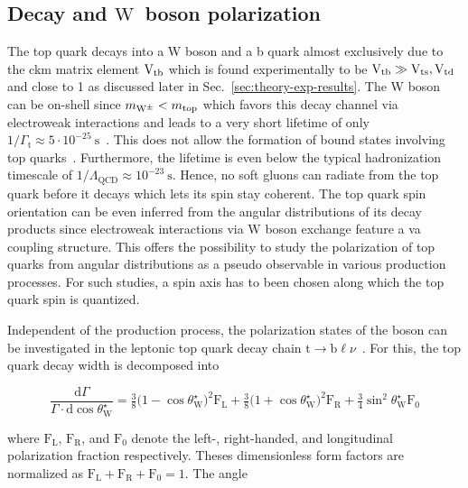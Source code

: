 \subsection{Decay and $\mathrm{W}$~boson polarization}

The top quark decays into a W boson and a b quark almost exclusively due to the \gls{ckm} matrix element ${\mathrm{V}_\mathrm{tb}}$ which is found experimentally to be ${\mathrm{V}_\mathrm{tb}}\gg{\mathrm{V}_\mathrm{ts}},{\mathrm{V}_\mathrm{td}}$ and close to 1 as discussed later in Sec.~\ref{sec:theory-exp-results}. The W boson can be on-shell since $m_{\mathrm{W}^{\pm}}<m_\mathrm{top}$ which favors this decay channel via electroweak interactions and leads to a very short lifetime of only $1/\Gamma_\mathrm{t}\approx 5\cdot10^{-25}~\mathrm{s}$~\cite{Olive:2016xmw}. This does not allow the formation of bound states involving top quarks~\cite{BIGI1986157}. Furthermore, the lifetime is even below the typical hadronization timescale of $1/\Lambda_\mathrm{QCD}\approx 10^{-23}~\mathrm{s}$. Hence, no soft gluons can radiate from the top quark before it decays which lets its spin stay coherent. The top quark spin orientation can be even inferred from the angular distributions of its decay products since electroweak interactions via $\mathrm{W}$ boson exchange feature a \gls{va} coupling structure. This offers the possibility to study the polarization of top quarks from angular distributions as a pseudo observable in various production processes. For such studies, a spin axis has to been chosen along which the top quark spin is quantized.

Independent of the production process, the polarization states of the \wboson boson can be investigated in the leptonic top quark decay chain $\mathrm{t}\to\mathrm{b}\ell\nu$~\cite{AguilarSaavedra:2010nx}. For this, the top quark decay width is decomposed into

\begin{equation}
\frac{\mathrm{d}\Gamma}{\Gamma\cdot\mathrm{d}\cos\theta^\star_\mathrm{W}}=\tfrac{3}{8}\big(1-\cos\theta^\star_\mathrm{W}\big)^{2}\mathrm{F}_\mathrm{L}+\tfrac{3}{8}\big(1+\cos\theta^\star_\mathrm{W}\big)^{2}\mathrm{F}_\mathrm{R}+\tfrac{3}{4}\sin^{2}\theta^\star_\mathrm{W}\mathrm{F}_{0} \label{eq:theory-diff-whel-fractions}
\end{equation}

where $\mathrm{F}_\mathrm{L}$, $\mathrm{F}_\mathrm{R}$, and $\mathrm{F}_{0}$ denote the left-, right-handed, and longitudinal polarization fraction respectively. Theses dimensionless form factors are normalized as $\mathrm{F}_\mathrm{L}+\mathrm{F}_\mathrm{R}+\mathrm{F}_{0}=1$. The angle 

